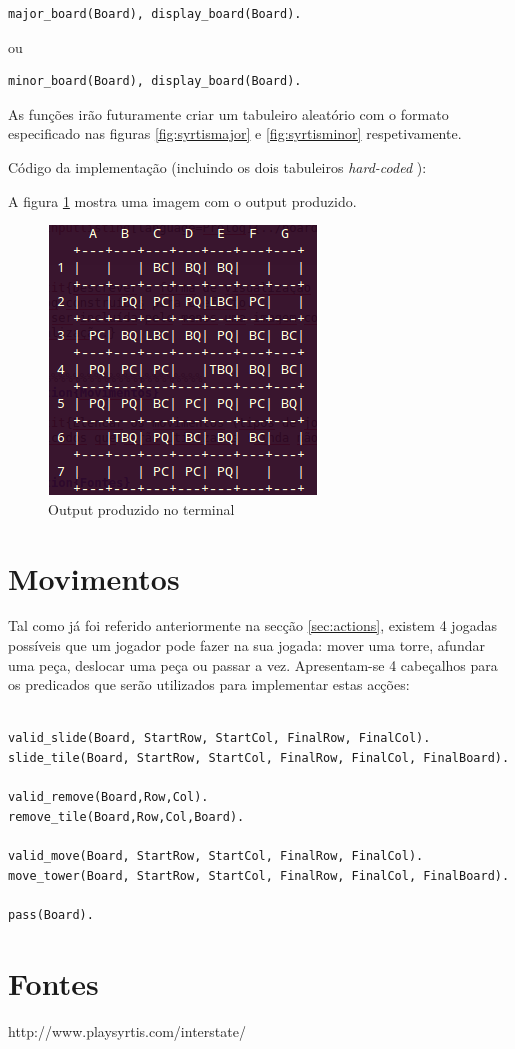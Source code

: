 \documentclass[a4paper]{article}
\begin{document}
\begin{lstlisting}
major_board(Board), display_board(Board).
\end{lstlisting}

ou

\begin{lstlisting}
minor_board(Board), display_board(Board).
\end{lstlisting}

As funções irão futuramente criar um tabuleiro aleatório com o formato especificado nas figuras \ref{fig:syrtismajor} e \ref{fig:syrtisminor} respetivamente.

Código da implementação (incluindo os dois tabuleiros \textit{hard-coded} ):



A figura \ref{fig:outputboard} mostra uma imagem com o output produzido.

\begin{figure}[h]
\centering
\includegraphics[scale=0.5]{outputboard.png}
\caption{Output produzido no terminal}
\label{fig:outputboard}
\end{figure}


\section{Movimentos}

Tal como já foi referido anteriormente na secção \ref{sec:actions}, existem 4 jogadas possíveis que um jogador pode fazer na sua jogada: mover uma torre, afundar uma peça, deslocar uma peça ou passar a vez. Apresentam-se 4 cabeçalhos para os predicados que serão utilizados para implementar estas acções:

\begin{lstlisting}

valid_slide(Board, StartRow, StartCol, FinalRow, FinalCol).
slide_tile(Board, StartRow, StartCol, FinalRow, FinalCol, FinalBoard).

valid_remove(Board,Row,Col).
remove_tile(Board,Row,Col,Board).

valid_move(Board, StartRow, StartCol, FinalRow, FinalCol).
move_tower(Board, StartRow, StartCol, FinalRow, FinalCol, FinalBoard).

pass(Board).

\end{lstlisting}

\section{Fontes}

http://www.playsyrtis.com/interstate/
\end{document}
